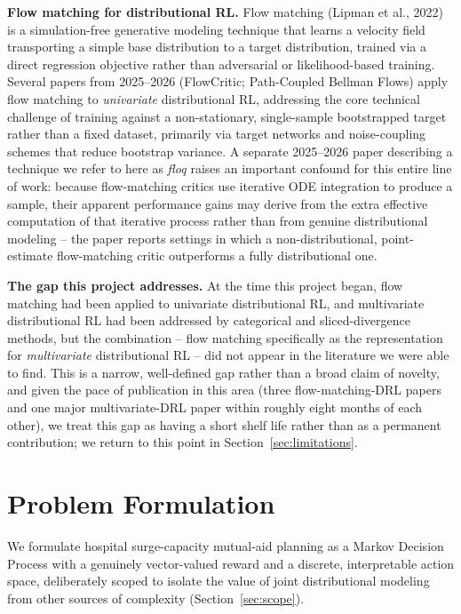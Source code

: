 \documentclass[11pt]{article}
\begin{document}
\textbf{Flow matching for distributional RL.} Flow matching (Lipman et al., 2022) is a simulation-free generative modeling technique that learns a velocity field transporting a simple base distribution to a target distribution, trained via a direct regression objective rather than adversarial or likelihood-based training. Several papers from 2025--2026 (FlowCritic; Path-Coupled Bellman Flows) apply flow matching to \emph{univariate} distributional RL, addressing the core technical challenge of training against a non-stationary, single-sample bootstrapped target rather than a fixed dataset, primarily via target networks and noise-coupling schemes that reduce bootstrap variance. A separate 2025--2026 paper describing a technique we refer to here as \emph{floq} raises an important confound for this entire line of work: because flow-matching critics use iterative ODE integration to produce a sample, their apparent performance gains may derive from the extra effective computation of that iterative process rather than from genuine distributional modeling -- the paper reports settings in which a non-distributional, point-estimate flow-matching critic outperforms a fully distributional one.

\textbf{The gap this project addresses.} At the time this project began, flow matching had been applied to univariate distributional RL, and multivariate distributional RL had been addressed by categorical and sliced-divergence methods, but the combination -- flow matching specifically as the representation for \emph{multivariate} distributional RL -- did not appear in the literature we were able to find. This is a narrow, well-defined gap rather than a broad claim of novelty, and given the pace of publication in this area (three flow-matching-DRL papers and one major multivariate-DRL paper within roughly eight months of each other), we treat this gap as having a short shelf life rather than as a permanent contribution; we return to this point in Section~\ref{sec:limitations}.

\section{Problem Formulation}
\label{sec:formulation}

We formulate hospital surge-capacity mutual-aid planning as a Markov Decision Process with a genuinely vector-valued reward and a discrete, interpretable action space, deliberately scoped to isolate the value of joint distributional modeling from other sources of complexity (Section~\ref{sec:scope}).
\end{document}
